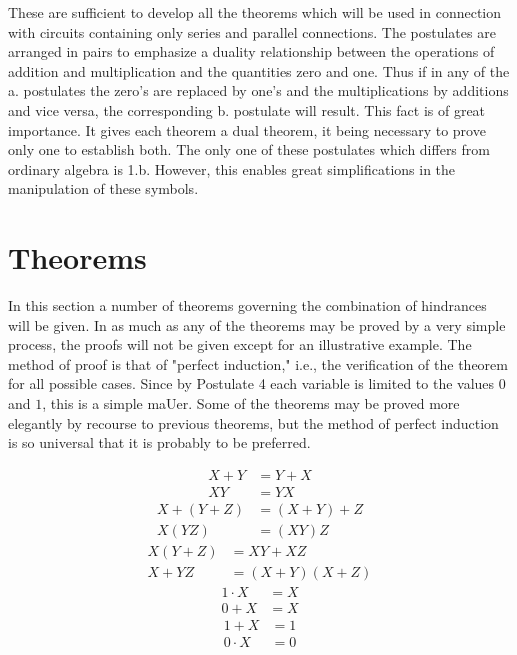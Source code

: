 \documentclass[12pt,oneside,letterpaper]{scrbook}
\begin{document}
		These are sufficient to develop all the theorems which will be used in connection with circuits containing only series and parallel connections. The postulates are arranged in pairs to emphasize a duality relationship between the operations of addition and multiplication and the quantities zero and one. Thus if in any of the a. postulates the zero's are replaced by one's and the multiplications by additions and vice versa, the corresponding b. postulate will result. This fact is of great importance. It gives each theorem a dual theorem, it being necessary to prove only one to establish both. The only one of these postulates which differs from ordinary algebra is 1.b. However, this enables great simplifications in the manipulation of these symbols.

		\section{Theorems}
		In this section a number of theorems governing the combination of hindrances will be given. In as much as any of the theorems may be proved by a very simple process, the proofs will not be given except for an illustrative example. The method of proof is that of "perfect induction," i.e., the verification of the theorem for all possible cases. Since by Postulate 4 each variable is limited to the values $0$ and $1$, this is a simple maUer. Some of the theorems may be proved more elegantly by recourse to previous theorems, but the method of perfect induction is so universal that it is probably to be preferred.

		\begin{subequations}
			\begin{align}
				X + Y &= Y + X \\
				XY &= YX
			\end{align}
		\end{subequations}
		\begin{subequations}
			\begin{align}
				X + (Y + Z) &= (X + Y) + Z  \\
				X(YZ) &= (XY)Z
			\end{align}
		\end{subequations}
		\begin{subequations}
			\begin{align}
				X(Y + Z) &= XY + XZ  \\
				X + YZ &= (X + Y)(X + Z)
			\end{align}
		\end{subequations}
		\begin{subequations}
			\begin{align}
				1\cdot X &= X  \\
				0+X&=X
			\end{align}
		\end{subequations}
		\begin{subequations}
			\begin{align}
				1+X&=1  \\
				0\cdot X &= 0
			\end{align}
		\end{subequations}
\end{document}
